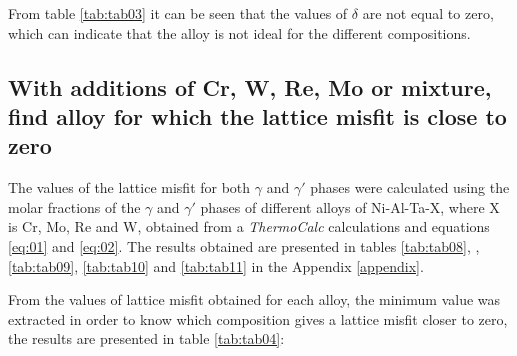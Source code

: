 From table \ref{tab:tab03} it can be seen that the values of $\delta$ are not equal to zero, which can indicate that the alloy is not ideal for the different compositions.

\newpage
\subsection{With additions of Cr, W, Re, Mo or mixture, find alloy for which the lattice misfit is close to zero}

The values of the lattice misfit for both $\gamma$ and $\gamma'$ phases were calculated using the molar fractions of the $\gamma$ and $\gamma'$ phases of different alloys of Ni-Al-Ta-X, where X is Cr, Mo, Re and W, obtained from a \textit{ThermoCalc} calculations and equations \ref{eq:01} and \ref{eq:02}. The results obtained are presented in tables \ref{tab:tab08}, ,\ref{tab:tab09}, \ref{tab:tab10} and \ref{tab:tab11} in the Appendix \ref{appendix}.

From the values of lattice misfit obtained for each alloy, the minimum value was extracted in order to know which composition gives a lattice misfit closer to zero, the results are presented in table \ref{tab:tab04}:

